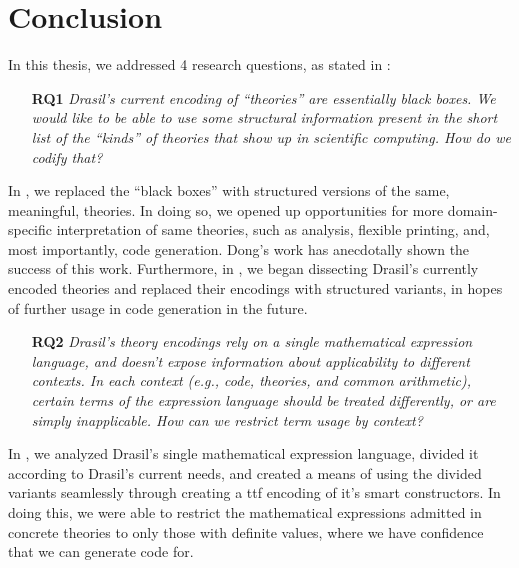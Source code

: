 \chapter{Conclusion}
\label{chap:conclusion}

In this thesis, we addressed 4 research questions, as stated in
:

\begin{enumerate}

    \item[\textbf{RQ1}] \textit{Drasil's current encoding of ``theories'' are
          essentially black boxes. We would like to be able to use some
          structural information present in the short list of the ``kinds'' of
          theories that show up in scientific computing. How do we codify that?}

\end{enumerate}

In , we replaced the ``black boxes'' with structured
versions of the same, meaningful, theories. In doing so, we opened up
opportunities for more domain-specific interpretation of same theories, such as
analysis, flexible printing, and, most importantly, code generation. Dong's work
\cite{Chen2022MEng} has anecdotally shown the success of this work. Furthermore,
in , we began dissecting Drasil's currently encoded
theories and replaced their encodings with structured variants, in hopes of
further usage in code generation in the future.

\begin{enumerate}
    
    \item[\textbf{RQ2}] \textit{Drasil's theory encodings rely on a single
          mathematical expression language, and doesn't expose information about
          applicability to different contexts. In each context (e.g., code,
          theories, and common arithmetic), certain terms of the expression
          language should be treated differently, or are simply inapplicable.
          How can we restrict term usage by context?}

\end{enumerate}

In , we analyzed Drasil's single mathematical
expression language, divided it according to Drasil's current needs, and created
a means of using the divided variants seamlessly through creating a \acs{ttf}
encoding of it's smart constructors. In doing this, we were able to restrict the
mathematical expressions admitted in concrete theories to only those with
definite values, where we have confidence that we can generate code for.

